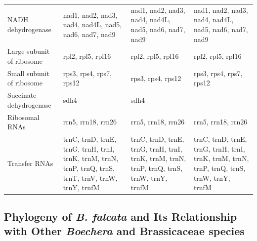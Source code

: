 \documentclass[9pt,twocolumn,twoside,lineno]{gsag3jnl}
\begin{document}
\begin{table}[p]
\begin{tableminipage}{\textwidth}
\begin{tabularx}{\textwidth}{@{}XXXX@{}}
NADH dehydrogenase               & nad1, nad2, nad3, nad4, nad4L, nad5, nad6, nad7, nad9                                                 & nad1, nad2, nad3, nad4, nad4L, nad5, nad6, nad7, nad9                                     & nad1, nad2, nad3, nad4, nad4L, nad5, nad6, nad7, nad9                                     \\
Large subunit of ribosome        & rpl2, rpl5, rpl16                                                                                     & rpl2, rpl5, rpl16                                                                         & rpl2, rpl5, rpl16                                                                         \\
Small subunit of ribosome        & rps3, rps4, rps7, rps12                                                                               & rps3, rps4, rps12                                                                         & rps3, rps4, rps7, rps12                                                                   \\
Succinate dehydrogenase          & sdh4                                                                                                  & sdh4                                                                                      & -                                                                                         \\
Ribosomal RNAs                   & rrn5, rrn18, rrn26                                                                                    & rrn5, rrn18, rrn26                                                                        & rrn5, rrn18, rrn26                                                                        \\
Transfer RNAs                    & trnC, trnD, trnE, trnG, trnH, trnI, trnK, trnM, trnN, trnP, trnQ, trnS, trnT, trnV, trnW, trnY, trnfM & trnC, trnD, trnE, trnG, trnH, trnI, trnK, trnM, trnN, trnP, trnQ, trnS, trnW, trnY, trnfM & trnC, trnD, trnE, trnG, trnH, trnI, trnK, trnM, trnN, trnP, trnQ, trnS, trnW, trnY, trnfM \\
\hline
\end{tabularx}
\label{tab:mito_genes}
\end{tableminipage}
\end{table}


\subsection{Phylogeny of \textit{B. falcata} and Its Relationship with Other \textit{Boechera} and Brassicaceae species}
\end{document}
